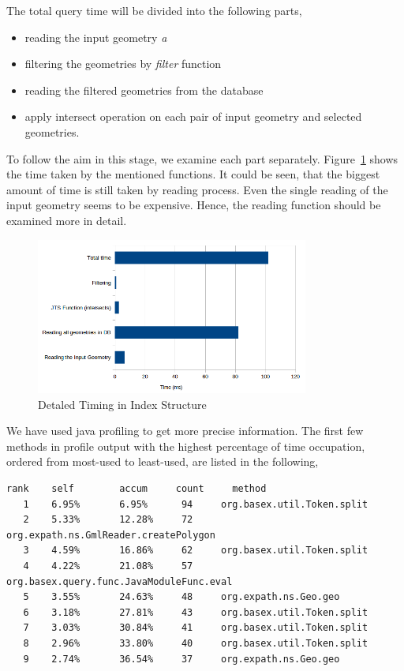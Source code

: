 \documentclass[a4paper,12pt]{article}
\begin{document}
The total query time will be divided into the following parts,

\begin{itemize}
\item reading the input geometry \textit{a}
\item filtering the geometries by \textit{filter} function 
\item reading the filtered geometries from the database
\item apply intersect operation on each pair of input geometry and selected geometries.
\end{itemize}

To follow the aim in this stage, we examine each part separately. Figure~\ref{figDetailedTiming} shows the time taken by the mentioned functions. It could be seen, that the biggest amount of time is still taken by reading process. Even the single reading of the input geometry seems to be expensive. Hence, the reading function should be examined more in detail.

\begin{figure}
\centering
\includegraphics[width=0.8\textwidth,height=0.25\textheight]{detailedTiming}
\caption{Detaled Timing in Index Structure}
\label{figDetailedTiming}
\end{figure}


We have used java profiling to get more precise information. The first few methods in profile output with the highest percentage of time occupation, ordered from most-used to least-used, are listed in the following,

\begin{verbatim}
rank   	self  		accum     count   	method
   1 	6.95%  		6.95%      94  	  org.basex.util.Token.split
   2  	5.33% 		12.28%     72 	  org.expath.ns.GmlReader.createPolygon
   3  	4.59% 		16.86%     62  	  org.basex.util.Token.split
   4  	4.22% 		21.08%     57  	  org.basex.query.func.JavaModuleFunc.eval
   5  	3.55% 		24.63%     48  	  org.expath.ns.Geo.geo
   6  	3.18% 		27.81%     43 	  org.basex.util.Token.split
   7 	3.03% 		30.84%     41  	  org.basex.util.Token.split
   8  	2.96% 		33.80%     40  	  org.basex.util.Token.split
   9  	2.74% 		36.54%     37  	  org.expath.ns.Geo.geo
\end{verbatim} 
\end{document}
